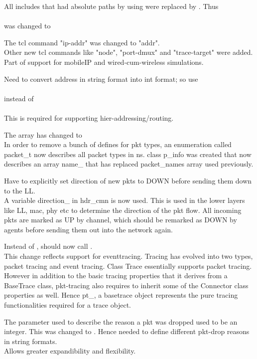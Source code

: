 \begin{flushleft}
All includes that had absolute paths by using \code{<>} were replaced by . Thus\\
\\
was changed to\\


The tcl command "ip-addr" was changed to "addr".\\
Other new tcl commands like "node", "port-dmux" and "trace-target" were added.\\
  Part of support for mobileIP and wired-cum-wireless simulations.


Need to convert address in string format into int format; 
so use\\
\\
instead of \\
\\
 This is required for supporting hier-addressing/routing.


The array  has changed to \\
 In order to remove a bunch of \code{#}defines for pkt types, an enumeration called packet\_t now describes all packet types in ns. class p\_info was created that now describes an array name\_ that has replaced packet\_names array used previously.


Have to explicitly set direction of new pkts to DOWN before sending them down to the LL.\\
 A variable direction\_ in hdr\_cmn is now used. This is used in the lower layers like LL, mac, phy etc to determine the direction of the pkt flow. All incoming pkts are marked as UP by channel, which should be remarked as DOWN by agents before sending them out into the network again.


Instead of , should now call .\\
 This change reflects support for eventtracing. 
Tracing has evolved into two types, packet tracing and event tracing.
Class Trace essentially supports packet tracing. 
However in addition to the basic tracing properties that it derives from a BaseTrace class, pkt-tracing also requires to inherit some of the Connector class properties as well. Hence pt\_, a basetrace object represents the pure tracing functionalities required for a trace object.


The parameter used to describe the reason a pkt was dropped used to be an integer. This was changed to . Hence needed to define different pkt-drop reasons in string formats. \\
 Allows greater expandibility and flexibility.



\end{flushleft}
